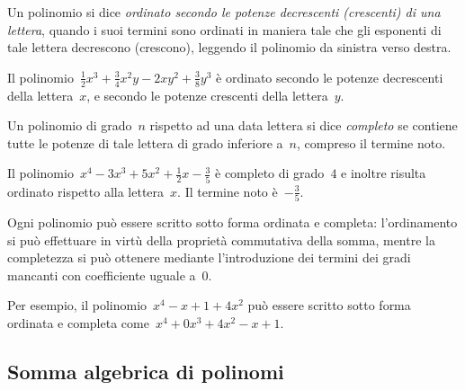 
\begin{definizione}
Un polinomio si dice \emph{ordinato secondo le potenze decrescenti 
(crescenti) di una lettera}, quando i suoi
termini sono ordinati in maniera tale che gli esponenti di tale lettera 
decrescono (crescono), leggendo il
polinomio da sinistra verso destra.
\end{definizione}

\begin{esempio}
Il polinomio~\(\frac{1}{2}x^3+\frac{3}{4}x^2y-2xy^2+\frac{3}{8}y^3\) è 
ordinato secondo le potenze decrescenti della lettera~\(x\), e secondo le 
potenze crescenti della lettera~\(y\).
\end{esempio}

\begin{definizione}
Un polinomio di grado~\(n\) rispetto ad una data lettera si dice 
\emph{completo} se contiene tutte le potenze di tale lettera di grado 
inferiore a~\(n\), compreso il termine noto.
\end{definizione}
\begin{esempio}
Il polinomio~\(x^4-3x^3+5x^2+\frac{1}{2}x-\frac{3}{5}\) è completo di 
grado~\(4\) e inoltre risulta ordinato rispetto alla lettera~\(x\). Il termine 
noto è~\(-\frac{3}{5}\).
\end{esempio}

\osservazione
Ogni polinomio può essere scritto sotto forma ordinata e completa: 
l'ordinamento si può effettuare in virtù della proprietà commutativa della 
somma, mentre
la completezza si può ottenere mediante l'introduzione dei termini dei 
gradi mancanti con coefficiente uguale a~\(0\).

Per esempio, il polinomio~\(x^4-x+1+4x^2\) può essere scritto sotto forma 
ordinata e completa come~\(x^4+0x^3+4x^2-x+1\).


\subsection{Somma algebrica di polinomi}
\label{subsec:10_poli_somma}

